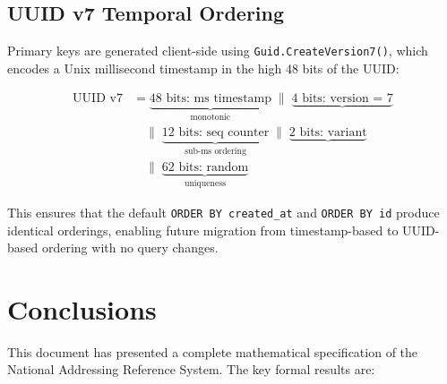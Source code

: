 \documentclass[12pt,a4paper]{article}
\theoremstyle{definition}
\theoremstyle{plain}
\theoremstyle{remark}
\begin{document}
\subsection{UUID v7 Temporal Ordering}

Primary keys are generated client-side using \texttt{Guid.CreateVersion7()},
which encodes a Unix millisecond timestamp in the high 48 bits of the UUID:

\begin{equation}
  \begin{aligned}
    \text{UUID v7} &=
      \underbrace{\text{48 bits: ms timestamp}}_{\text{monotonic}}
      \;\|\;
      \underbrace{\text{4 bits: version = 7}}_{} \\
    &\quad\|\;
      \underbrace{\text{12 bits: seq counter}}_{\text{sub-ms ordering}}
      \;\|\;
      \underbrace{\text{2 bits: variant}}_{} \\
    &\quad\|\;
      \underbrace{\text{62 bits: random}}_{\text{uniqueness}}
  \end{aligned}
  \label{eq:uuid_v7}
\end{equation}

This ensures that the default \texttt{ORDER BY created\_at} and
\texttt{ORDER BY id} produce identical orderings, enabling future migration
from timestamp-based to UUID-based ordering with no query changes.

\section{Conclusions}
\label{sec:conclusions}

This document has presented a complete mathematical specification of the
National Addressing Reference System. The key formal results are:
\end{document}
